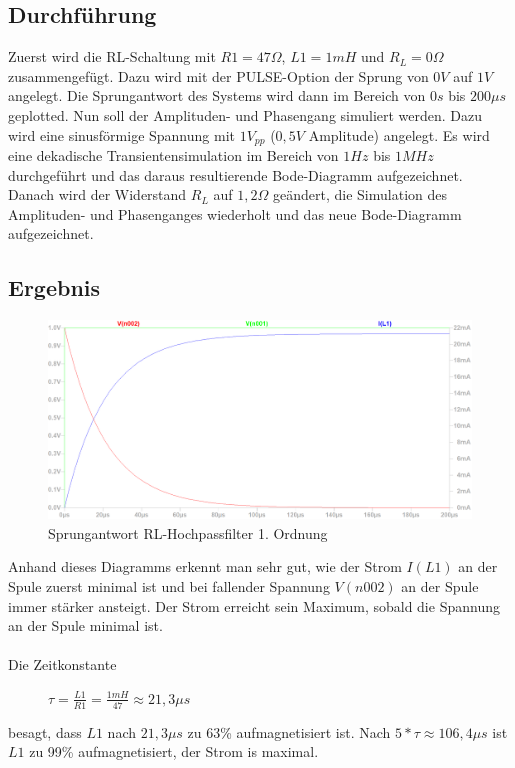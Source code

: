 \documentclass[12pt,a4paper,titlepage]{article}
\begin{document}
\subsection{Durchführung}
Zuerst wird die RL-Schaltung mit $R1 = 47\Omega$, $L1 = 1mH$ und $R_L = 0 \Omega$ zusammengefügt. Dazu wird mit der PULSE-Option der Sprung von $0V$ auf $1V$ angelegt. Die Sprungantwort des Systems wird dann im Bereich von $0s$ bis $200\mu s$ geplotted. Nun soll der Amplituden- und Phasengang simuliert werden. Dazu wird eine sinusförmige Spannung mit $1V_{pp}$ ($0,5V$ Amplitude) angelegt. Es wird eine dekadische Transientensimulation im Bereich von $1Hz$ bis $1MHz$ durchgeführt und das daraus resultierende Bode-Diagramm aufgezeichnet. Danach wird der Widerstand $R_L$ auf $1,2\Omega$ geändert, die Simulation des Amplituden- und Phasenganges wiederholt und das neue Bode-Diagramm aufgezeichnet.

\subsection{Ergebnis}

\begin{figure}[H]
  \centering
  \includegraphics[width=150mm]{sprungantwort_filter02.png}
  \caption{Sprungantwort RL-Hochpassfilter 1. Ordnung}
\end{figure}

Anhand dieses Diagramms erkennt man sehr gut, wie der Strom $I(L1)$ an der Spule zuerst minimal ist und bei fallender Spannung $V(n002)$ an der Spule immer stärker ansteigt. Der Strom erreicht sein Maximum, sobald die Spannung an der Spule minimal ist.\\\\
Die Zeitkonstante
\begin{figure}[H]
  \centering
  $\tau = \frac{L1}{R1} = \frac{1mH}{47} \approx 21,3\mu s$
\end{figure}
\noindent besagt, dass $L1$ nach $21,3\mu s$ zu 63\% aufmagnetisiert ist. Nach $5*\tau \approx 106,4\mu s$ ist $L1$ zu 99\% aufmagnetisiert, der Strom is maximal.
\end{document}
